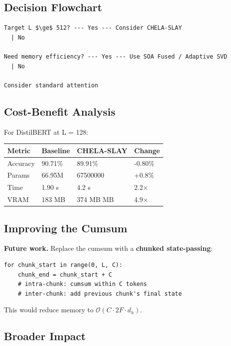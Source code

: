 \subsection{Decision Flowchart}

\begin{lstlisting}
Target L $\ge$ 512? --- Yes --- Consider CHELA-SLAY
  | No
   
Need memory efficiency? --- Yes --- Use SOA Fused / Adaptive SVD
  | No
   
Consider standard attention
\end{lstlisting}

\subsection{Cost-Benefit Analysis}

For DistilBERT at L = 128:

\begin{table}[H]
\centering
\small
\begin{tabular}{llll}
\toprule
\textbf{Metric} & \textbf{Baseline} & \textbf{CHELA-SLAY} & \textbf{Change} \\
\midrule
Accuracy & 90.71\% & 89.91\% & -0.80\% \\
Params & 66.95M & 67500000 & +0.8\% \\
Time & 1.90 s & 4.2 s & 2.2$\times$ \\
VRAM & 183 MB & 374 MB MB & 4.9$\times$ \\
\bottomrule
\end{tabular}
\end{table}

\subsection{Improving the Cumsum}

\textbf{Future work.} Replace the cumsum with a \textbf{chunked state-passing}:

\begin{lstlisting}
for chunk_start in range(0, L, C):
    chunk_end = chunk_start + C
    # intra-chunk: cumsum within C tokens
    # inter-chunk: add previous chunk's final state
\end{lstlisting}

This would reduce memory to $\mathcal{O}(C \cdot 2F \cdot d_h)$.

\subsection{Broader Impact}

